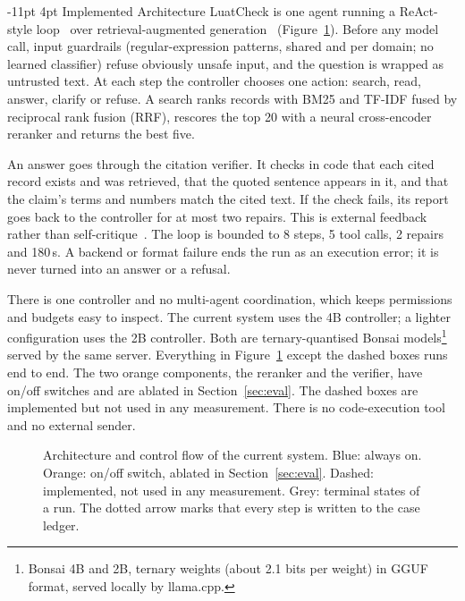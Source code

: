 \documentclass[a4paper,11pt]{article}
\makeatletter
\renewcommand\section{\@startsection{section}{1}{\z@}%
                                   {-11pt \@plus -2pt \@minus -1pt}%
                                   {4pt \@plus 1pt \@minus 1pt}%
                                   {\normalfont\large\bfseries}}
\makeatother
\begin{document}
\section{Implemented Architecture}\label{sec:arch}
LuatCheck is one agent running a ReAct-style loop~\citep{yao2023react} over retrieval-augmented generation~\citep{lewis2020rag} (Figure~\ref{fig:arch}). Before any model call, input guardrails (regular-expression patterns, shared and per domain; no learned classifier) refuse obviously unsafe input, and the question is wrapped as untrusted text. At each step the controller chooses one action: search, read, answer, clarify or refuse. A search ranks records with BM25 and TF-IDF fused by reciprocal rank fusion (RRF), rescores the top 20 with a neural cross-encoder reranker and returns the best five.

An answer goes through the citation verifier. It checks in code that each cited record exists and was retrieved, that the quoted sentence appears in it, and that the claim's terms and numbers match the cited text. If the check fails, its report goes back to the controller for at most two repairs. This is external feedback rather than self-critique~\citep{huang2024selfcorrect}. The loop is bounded to 8 steps, 5 tool calls, 2 repairs and 180\,s. A backend or format failure ends the run as an execution error; it is never turned into an answer or a refusal.

There is one controller and no multi-agent coordination, which keeps permissions and budgets easy to inspect. The current system uses the 4B controller; a lighter configuration uses the 2B controller. Both are ternary-quantised Bonsai models\footnote{Bonsai 4B and 2B, ternary weights (about 2.1 bits per weight) in GGUF format, served locally by llama.cpp.} served by the same server. Everything in Figure~\ref{fig:arch} except the dashed boxes runs end to end. The two orange components, the reranker and the verifier, have on/off switches and are ablated in Section~\ref{sec:eval}. The dashed boxes are implemented but not used in any measurement. There is no code-execution tool and no external sender.
\begin{figure}[!tbp]\centering

\caption{Architecture and control flow of the current system. Blue: always on. Orange: on/off switch, ablated in Section~\ref{sec:eval}. Dashed: implemented, not used in any measurement. Grey: terminal states of a run. The dotted arrow marks that every step is written to the case ledger.}\label{fig:arch}
\end{figure}
\end{document}
